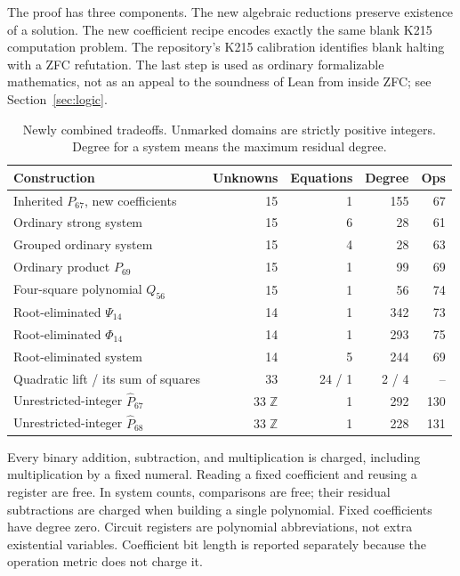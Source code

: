 \documentclass[11pt,a4paper]{article}
\theoremstyle{remark}\newtheorem{remark}[theorem]{Remark}
\newcommand{\ZZ}{\mathbb Z}
\begin{document}
The proof has three components. The new algebraic reductions preserve
existence of a solution. The new coefficient recipe encodes exactly the
same blank K215 computation problem. The repository's K215 calibration
identifies blank halting with a ZFC refutation. The last step is used as
ordinary formalizable mathematics, not as an appeal to the soundness of
Lean from inside ZFC; see Section~\ref{sec:logic}.

\begin{table}[ht]
\centering\small
\begin{tabular}{@{}p{55mm}rrrr@{}}
\toprule
Construction & Unknowns & Equations & Degree & Ops\\
\midrule
Inherited \(P_{67}\), new coefficients & 15 & 1 & 155 & 67\\
Ordinary strong system & 15 & 6 & 28 & 61\\
Grouped ordinary system & 15 & 4 & 28 & 63\\
Ordinary product \(P_{69}\) & 15 & 1 & 99 & 69\\
Four-square polynomial \(Q_{56}\) & 15 & 1 & 56 & 74\\
Root-eliminated \(\Psi_{14}\) & 14 & 1 & 342 & 73\\
Root-eliminated \(\Phi_{14}\) & 14 & 1 & 293 & 75\\
Root-eliminated system & 14 & 5 & 244 & 69\\
Quadratic lift / its sum of squares & 33 & 24 / 1 & 2 / 4 & --\\
Unrestricted-integer \(\widehat P_{67}\) & \(33\;\ZZ\) & 1 & 292 & 130\\
Unrestricted-integer \(\widehat P_{68}\) & \(33\;\ZZ\) & 1 & 228 & 131\\
\bottomrule
\end{tabular}
\caption{Newly combined tradeoffs. Unmarked domains are strictly positive
integers. Degree for a system means the maximum residual degree.}
\label{tab:new}
\end{table}

Every binary addition, subtraction, and multiplication is charged, including
multiplication by a fixed numeral. Reading a fixed coefficient and reusing a
register are free. In system counts, comparisons are free; their residual
subtractions are charged when building a single polynomial. Fixed
coefficients have degree zero. Circuit registers are polynomial
abbreviations, not extra existential variables. Coefficient bit length is
reported separately because the operation metric does not charge it.
\end{document}
